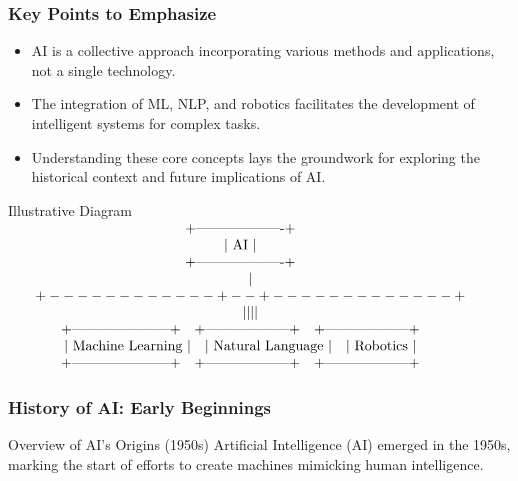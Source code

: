 \documentclass[aspectratio=169]{beamer}
\begin{document}
\begin{frame}[fragile]
    \frametitle{Key Points to Emphasize}

    \begin{itemize}
        \item AI is a collective approach incorporating various methods and applications, not a single technology.
        \item The integration of ML, NLP, and robotics facilitates the development of intelligent systems for complex tasks.
        \item Understanding these core concepts lays the groundwork for exploring the historical context and future implications of AI.
    \end{itemize}

    \begin{block}{Illustrative Diagram}
        \centering
        $\begin{array}{c}
        \text{+-------------------+} \\
        \text{|       AI          |} \\
        \text{+-------------------+} \\
        \hspace{5mm} | \\
        \hspace{5mm} +------------+--+-------------+ \\
        \hspace{5mm} |            |  |             | \\
        \text{+---------------------+} \quad \text{+------------------+} \quad \text{+------------------+} \\
        \text{| Machine Learning   |} \quad \text{| Natural Language    |} \quad \text{|    Robotics       |} \\
        \text{+---------------------+} \quad \text{+------------------+} \quad \text{+------------------+}
        \end{array}$
    \end{block}
\end{frame}

\begin{frame}[fragile]
    \frametitle{History of AI: Early Beginnings}
    \begin{block}{Overview of AI's Origins (1950s)}
        Artificial Intelligence (AI) emerged in the 1950s, marking the start of efforts to create machines mimicking human intelligence.
    \end{block}
\end{frame}
\end{document}
